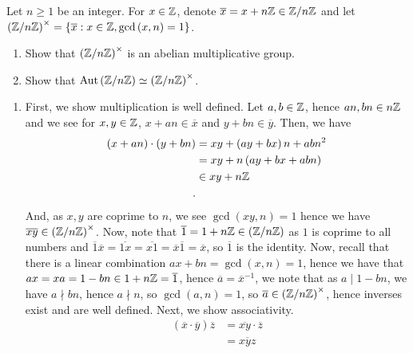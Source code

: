 \documentclass[a4paper]{article}
\begin{document}
\newpage
\begin{problem}[2]
	Let \(n \ge 1 \) be an integer. For \( x \in \mathbb{Z}\), denote \(\overline{x} = x + n\mathbb{Z} \in \mathbb{Z} / n\mathbb{Z}\) and let \(\left( \mathbb{Z} / n\mathbb{Z} \right)^{\times} = \{\overline{x} : x \in \mathbb{Z}, \gcd\left( x, n \right) = 1\}  \).
	\begin{enumerate}
		\item Show that \(\left( \mathbb{Z} / n\mathbb{Z} \right)^{\times} \) is an abelian multiplicative group.
		\item Show that \(\operatorname{Aut}\left( \mathbb{Z} / n\mathbb{Z} \right) \simeq \left( \mathbb{Z} / n\mathbb{Z} \right)^{\times} \).
	\end{enumerate}
\end{problem}
\begin{solution}
	\begin{enumerate}
		\item First, we show multiplication is well defined. Let \(a, b \in \mathbb{Z}\), hence \(an, bn \in n\mathbb{Z}\) and we see for \(x, y \in \mathbb{Z}\), \(x + an \in \overline{x}\) and \(y + bn \in \overline{y}\). Then, we have
			\begin{align*}
				\left( x + an \right)  \cdot \left( y + bn \right) &=  xy + \left( ay + bx \right) n + abn^2  \\
										   &= xy + n\left( ay + bx + abn \right)  \\
										   &\in xy + n\mathbb{Z} \\
			.\end{align*}
			And, as \(x, y \) are coprime to \(n\), we see \(\gcd\left( xy, n \right) = 1\) hence we have \(\overline{xy} \in \left( \mathbb{Z} / n\mathbb{Z} \right)^{\times} \). Now, note that \(\overline{1} = 1 + n\mathbb{Z} \in \left( \mathbb{Z} / n\mathbb{Z} \right) \) as \(1\) is coprime to all numbers and \(\overline{1}\overline{x} = \overline{1x} =  \overline{x1} = \overline{x}\overline{1}= \overline{x}\), so \(\overline{1}\) is the identity. Now, recall that there is a linear combination \(ax + bn = \gcd\left( x, n \right) = 1\), hence we have that \(ax = xa = 1 - bn \in 1 + n\mathbb{Z} = \overline{1}\), hence \(\overline{a} = \overline{x}^{-1}\), we note that as \(a \mid 1-bn\), we have \(a \nmid bn\), hence \(a \nmid n\), so \(\gcd\left( a, n \right) = 1 \), so \(\overline{a} \in \left( \mathbb{Z} / n\mathbb{Z} \right)^{\times} \), hence inverses exist and are well defined. Next, we show associativity.			\begin{align*}
				\left( \overline{x} \cdot \overline{y} \right) \overline{z} &= \overline{xy} \cdot \overline{z}\\
				&= \overline{xyz} \\

\end{align*}
\end{enumerate}
\end{solution}
\end{document}
